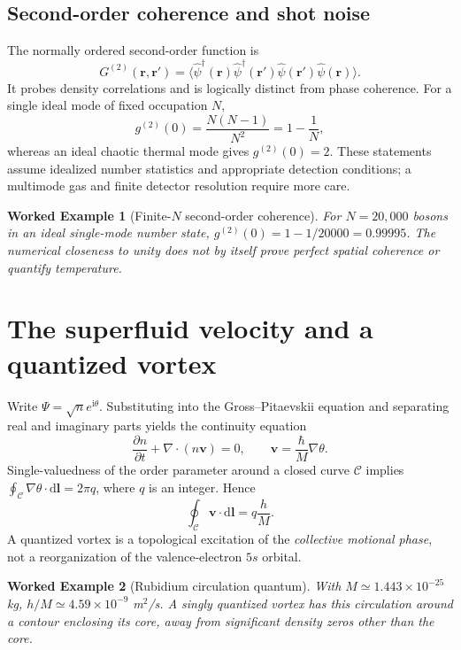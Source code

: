 \documentclass[11pt,a4paper]{article}
\newtheorem{example}{Worked Example}
\newcommand{\dd}{\mathrm d}
\newcommand{\ii}{\mathrm i}
\newcommand{\hc}{\hbar}
\begin{document}
\subsection{Second-order coherence and shot noise}
The normally ordered second-order function is
\begin{equation}
G^{(2)}(\mathbf r,\mathbf r')=\langle\hat\psi^\dagger(\mathbf r)\hat\psi^\dagger(\mathbf r')\hat\psi(\mathbf r')\hat\psi(\mathbf r)\rangle.
\end{equation}
It probes density correlations and is logically distinct from phase coherence. For a single ideal mode of fixed occupation $N$,
\begin{equation}g^{(2)}(0)=\frac{N(N-1)}{N^2}=1-\frac1N,\end{equation}
whereas an ideal chaotic thermal mode gives $g^{(2)}(0)=2$. These statements assume idealized number statistics and appropriate detection conditions; a multimode gas and finite detector resolution require more care.

\begin{example}[Finite-$N$ second-order coherence]
For $N=20,000$ bosons in an ideal single-mode number state, $g^{(2)}(0)=1-1/20000=0.99995$. The numerical closeness to unity does not by itself prove perfect spatial coherence or quantify temperature.
\end{example}

\section{The superfluid velocity and a quantized vortex}
Write $\Psi=\sqrt n e^{\ii\theta}$. Substituting into the Gross--Pitaevskii equation and separating real and imaginary parts yields the continuity equation
\begin{equation}\frac{\partial n}{\partial t}+\nabla\cdot(n\mathbf v)=0,\qquad \boxed{\mathbf v=\frac{\hc}{M}\nabla\theta.}\end{equation}
Single-valuedness of the order parameter around a closed curve $\mathcal C$ implies $\oint_{\mathcal C}\nabla\theta\cdot\dd\mathbf l=2\pi q$, where $q$ is an integer. Hence
\begin{equation}\oint_{\mathcal C}\mathbf v\cdot\dd\mathbf l=q\frac hM.\end{equation}
A quantized vortex is a topological excitation of the \emph{collective motional phase}, not a reorganization of the valence-electron $5s$ orbital.

\begin{example}[Rubidium circulation quantum]
With $M\simeq1.443\times10^{-25}$ kg, $h/M\simeq4.59\times10^{-9}$ m$^2$/s. A singly quantized vortex has this circulation around a contour enclosing its core, away from significant density zeros other than the core.
\end{example}
\end{document}
